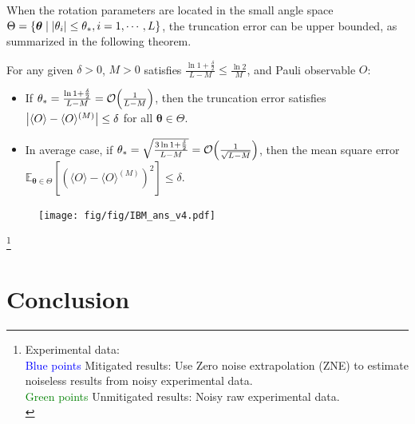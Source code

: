 \documentclass[10pt]{beamer}
\begin{document}
\begin{CJK}{UTF8}{gbsn}
 \begin{frame}[fragile]
  When the rotation parameters are located in the small angle space $\Theta=\{\bm{\theta}\mid \abs{\theta_i}\leq \theta_* ,i=1,\cdots,L \}$, the truncation error can be upper bounded, as summarized in the following theorem. 
  \begin{mdframed}
    \begin{theorem}\label{thm:truncation_error}
      For any given $\delta>0$, $M>0$ satisfies $\frac{\ln{1+\frac{\delta}{2}}}{L-M}\leq \frac{\ln{2}}{M}$, and Pauli observable $O$:
    \begin{itemize}
      \item If $\theta_*=\frac{\ln{1+\frac{\delta}{2}}}{L-M}=\order{\frac{1}{L-M}}$, then the truncation error satisfies $\abs{\langle O \rangle - \langle O \rangle ^{(M)}}\leq \delta$ for all $\bm{\theta}\in \Theta$.
      \item In average case, if $\theta_*=\sqrt{\frac{3\ln{1+\frac{\delta}{2}}}{L-M}}=\order{\frac{1}{\sqrt{L-M}}}$, then the mean square error $\mathbb{E}_{\bm{\theta}\in \Theta}[(\langle O \rangle - \langle O \rangle ^{(M)})^2]\leq \delta$.
    \end{itemize} 
    \end{theorem}
  \end{mdframed}
  \vspace{0em}
\end{frame}


\begin{frame}[fragile]
  \begin{figure}
    \centering
    \texttt{[image: fig/fig/IBM\_ans\_v4.pdf]}
  \end{figure}
   \vspace{-1em}
   \footnote{Experimental data:\\
    \textcolor{blue}{Blue points} Mitigated results: Use Zero noise extrapolation (ZNE) to estimate noiseless results from noisy experimental data.\\
  \textcolor{green}{Green points} Unmitigated results: Noisy raw experimental data.\\}
\end{frame}

\section{Conclusion}


\end{CJK}
\end{document}

